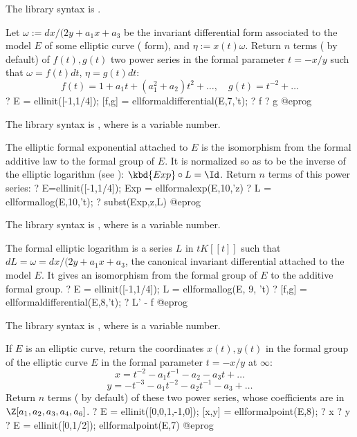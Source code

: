 The library syntax is .

\label{se:ellformaldifferential}
Let $\omega := dx / (2y+a_1x+a_3$ be the invariant differential form
associated to the model $E$ of some elliptic curve ( form),
and $\eta := x(t)\omega$. Return $n$ terms ( by default)
of $f(t),g(t)$ two power series in the formal parameter $t=-x/y$ such that
$\omega = f(t) dt$, $\eta = g(t) dt$:
 $$f(t) = 1+a_1 t + (a_1^2 + a_2) t^2 + \dots,\quad
   g(t) = t^{-2} +\dots $$
 \bprog
 ? E = ellinit([-1,1/4]); [f,g] = ellformaldifferential(E,7,'t);
 ? f
 ? g
@eprog

The library syntax is , where  is a variable number.

\label{se:ellformalexp}
The elliptic formal exponential  attached to $E$ is the
isomorphism from the formal additive law to the formal group of $E$. It is
normalized so as to be the inverse of the elliptic logarithm (see
): $\kbd{Exp} \circ L = \Id$. Return $n$ terms of this
power series:
\bprog
? E=ellinit([-1,1/4]); Exp = ellformalexp(E,10,'z)
? L = ellformallog(E,10,'t);
? subst(Exp,z,L)
@eprog

The library syntax is , where  is a variable number.

\label{se:ellformallog}
The formal elliptic logarithm is a series $L$ in $t K[[t]]$
such that $d L = \omega = dx / (2y + a_1x + a_3$, the canonical invariant
differential attached to the model $E$. It gives an isomorphism
from the formal group of $E$ to the additive formal group.
\bprog
? E = ellinit([-1,1/4]); L = ellformallog(E, 9, 't)
? [f,g] = ellformaldifferential(E,8,'t);
? L' - f
@eprog

The library syntax is , where  is a variable number.

\label{se:ellformalpoint}
If $E$ is an elliptic curve, return the coordinates $x(t), y(t)$ in the
formal group of the elliptic curve $E$ in the formal parameter $t = -x/y$
at $\infty$:
$$ x = t^{-2} -a_1 t^{-1} - a_2 - a_3 t + \dots $$
$$ y = - t^{-3} -a_1 t^{-2} - a_2t^{-1} -a_3 + \dots $$
Return $n$ terms ( by default) of these two power
series, whose coefficients are in $\Z[a_1,a_2,a_3,a_4,a_6]$.
\bprog
? E = ellinit([0,0,1,-1,0]); [x,y] = ellformalpoint(E,8);
? x
? y
? E = ellinit([0,1/2]); ellformalpoint(E,7)
@eprog

